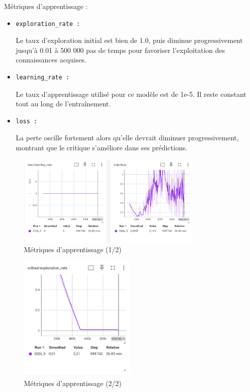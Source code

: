 \documentclass{article}
\begin{document}
    Métriques d'apprentissage :
    \begin{itemize} 
        \item \begin{verbatim}exploration_rate :\end{verbatim}Le taux d'exploration initial est bien de 1.0, puis diminue progressivement jusqu'à 0.01 à 500 000 pas de temps pour favoriser l'exploitation des connaissances acquises.
        \item \begin{verbatim}learning_rate :\end{verbatim}Le taux d'apprentissage utilisé pour ce modèle est de 1e-5. Il reste constant tout au long de l'entraînement.
        \item \begin{verbatim}loss :\end{verbatim}La perte oscille fortement alors qu'elle devrait diminuer progressivement, montrant que le critique s'améliore dans ses prédictions.
    \end{itemize}

    \begin{figure}[ht]
        \centering
        \includegraphics[width=0.8\textwidth]{11.png}
        \caption{Métriques d'apprentissage (1/2)}
    \end{figure}

    \clearpage
    
    \begin{figure}[ht]
        \centering
        \includegraphics[width=0.5\textwidth]{12.png}
        \caption{Métriques d'apprentissage (2/2)}
    \end{figure}
\end{document}
